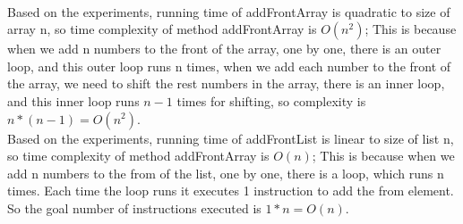 \documentclass[12pt]{article}
\begin{document}
~~\\
Based on the experiments, running time of addFrontArray is quadratic to size of array n, so time complexity of method addFrontArray is $O(n^2)$; This is because when we add n numbers to the front of the array, one by one, there is an outer loop, and this outer loop runs n times, when we add each number to the front of the array, we need to shift the rest numbers in the array, there is an inner loop, and this inner loop runs $n-1$ times for shifting, so complexity is $n*(n-1) = O(n^2)$.\\
Based on the experiments, running time of addFrontList is linear to size of list n, so time complexity of method addFrontArray is $O(n)$; This is because when we add n numbers to the from of the list, one by one, there is a loop, which runs n times. Each time the loop runs it executes 1 instruction to add the from element. So the goal number of instructions executed is $1*n = O(n)$.
\\
\end{document}
